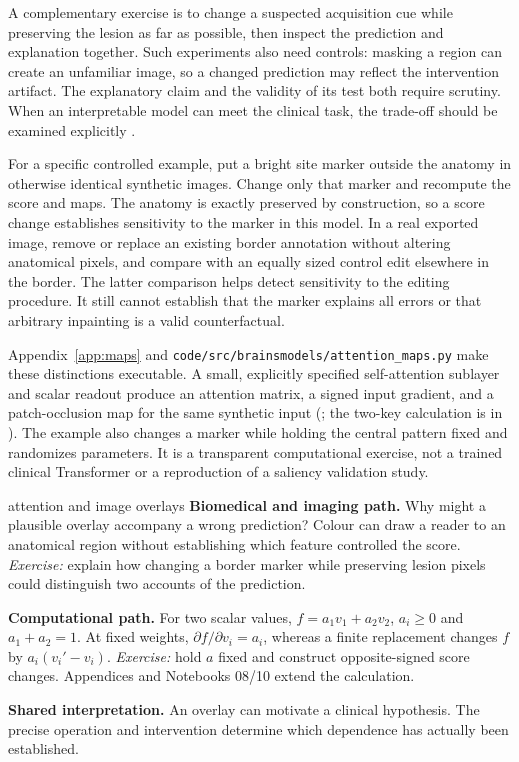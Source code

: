 \documentclass[11pt,a4paper]{article}
\begin{document}
A complementary exercise is to change a suspected acquisition cue while preserving the lesion as far as possible, then inspect the prediction and explanation together. Such experiments also need controls: masking a region can create an unfamiliar image, so a changed prediction may reflect the intervention artifact. The explanatory claim and the validity of its test both require scrutiny. When an interpretable model can meet the clinical task, the trade-off should be examined explicitly \citep{rudin2019}.

For a specific controlled example, put a bright site marker outside the anatomy in otherwise identical synthetic images. Change only that marker and recompute the score and maps. The anatomy is exactly preserved by construction, so a score change establishes sensitivity to the marker in this model. In a real exported image, remove or replace an existing border annotation without altering anatomical pixels, and compare with an equally sized control edit elsewhere in the border. The latter comparison helps detect sensitivity to the editing procedure. It still cannot establish that the marker explains all errors or that arbitrary inpainting is a valid counterfactual.

Appendix~\ref{app:maps} and \texttt{code/src/brainsmodels/attention\_maps.py} make these distinctions executable. A small, explicitly specified self-attention sublayer and scalar readout produce an attention matrix, a signed input gradient, and a patch-occlusion map for the same synthetic input (; the two-key calculation is in ). The example also changes a marker while holding the central pattern fixed and randomizes parameters. It is a transparent computational exercise, not a trained clinical Transformer or a reproduction of a saliency validation study.

\begin{perspectives}{attention and image overlays}
\textbf{Biomedical and imaging path.} Why might a plausible overlay accompany a wrong prediction? Colour can draw a reader to an anatomical region without establishing which feature controlled the score. \emph{Exercise:} explain how changing a border marker while preserving lesion pixels could distinguish two accounts of the prediction.

\textbf{Computational path.} For two scalar values, $f=a_1v_1+a_2v_2$, $a_i\geq0$ and $a_1+a_2=1$. At fixed weights, $\partial f/\partial v_i=a_i$, whereas a finite replacement changes $f$ by $a_i(v_i'-v_i)$. \emph{Exercise:} hold $a$ fixed and construct opposite-signed score changes. Appendices and Notebooks 08/10 extend the calculation.

\textbf{Shared interpretation.} An overlay can motivate a clinical hypothesis. The precise operation and intervention determine which dependence has actually been established.
\end{perspectives}
\end{document}
